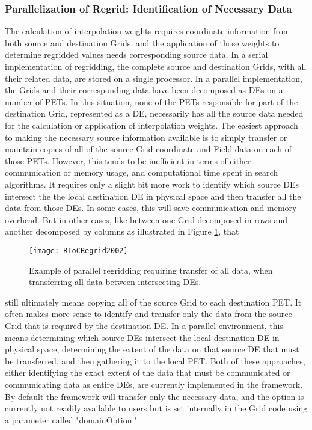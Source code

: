 \subsubsection{Parallelization of Regrid: Identification of Necessary Data}
The calculation of interpolation weights requires coordinate information from
both source and destination Grids, and the application of those weights to
determine regridded values needs corresponding source data.  In a serial
implementation of regridding, the complete source and destination Grids, with
all their related data, are stored on a single processor.  In a parallel
implementation, the Grids and their corresponding data have been decomposed as
DEs on a number of PETs.  In this situation, none of the PETs responsible for
part of the destination Grid, represented as a DE, necessarily has all the source
data needed for the calculation or application of interpolation weights.  The
easiest approach to making the necessary source information available is to
simply transfer or maintain copies of all of the source Grid coordinate and Field
data on each of those PETs.  However, this tends to be inefficient in terms of
either communication or memory usage, and computational time spent in search
algorithms.  It requires only a slight bit more work to identify which source DEs
intersect the the local destination DE in physical space and then transfer all
the data from those DEs.  In some cases, this will save communication and memory
overhead.  But in other cases, like between one Grid decomposed in rows and
another decomposed by columns as illustrated in Figure \ref{fig:RToCRegrid}, that

\begin{center}
\begin{figure}
\caption{Example of parallel regridding requiring transfer of all data,
         when transferring all data between intersecting DEs. }
\label{fig:RToCRegrid}
\resizebox{\textwidth}{!}
  {\texttt{[image: RToCRegrid2002]}}
\end{figure}
\end{center}

still ultimately means copying all of the source Grid to each destination PET.
It often makes more sense to identify and transfer only the data from the
source Grid that is required by the destination DE.  In a parallel environment,
this means determining which source DEs intersect the local destination DE in
physical space, determining the extent of the data on that source DE that must
be transferred, and then gathering it to the local PET.  Both of these
approaches, either identifying the exact extent of the data that must be
communicated or communicating data as entire DEs, are currently implemented in
the framework.  By default the framework will transfer only the necessary data,
and the option is currently not readily available to users but is set internally
in the Grid code using a parameter called "domainOption."

